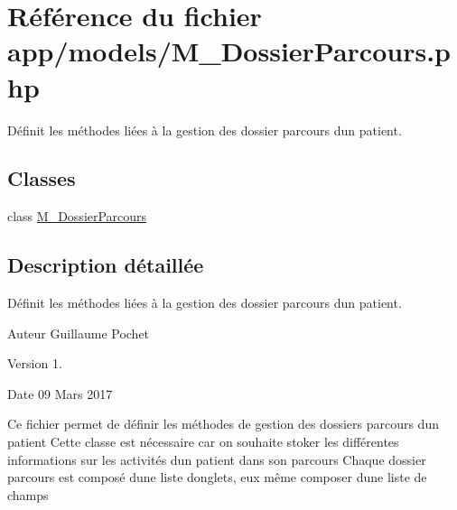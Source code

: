 \hypertarget{_m___dossier_parcours_8php}{}\section{Référence du fichier app/models/\+M\+\_\+\+Dossier\+Parcours.php}
\label{_m___dossier_parcours_8php}


Définit les méthodes liées à la gestion des dossier parcours d\textquotesingle{}un patient.  


\subsection*{Classes}
\begin{DoxyCompactItemize}
\item 
class \hyperlink{class_m___dossier_parcours}{M\+\_\+\+Dossier\+Parcours}
\end{DoxyCompactItemize}


\subsection{Description détaillée}
Définit les méthodes liées à la gestion des dossier parcours d\textquotesingle{}un patient. 

\begin{DoxyAuthor}{Auteur}
Guillaume Pochet 
\end{DoxyAuthor}
\begin{DoxyVersion}{Version}
1. 
\end{DoxyVersion}
\begin{DoxyDate}{Date}
09 Mars 2017
\end{DoxyDate}
Ce fichier permet de définir les méthodes de gestion des dossiers parcours d\textquotesingle{}un patient Cette classe est nécessaire car on souhaite stoker les différentes informations sur les activités d\textquotesingle{}un patient dans son parcours Chaque dossier parcours est composé d\textquotesingle{}une liste d\textquotesingle{}onglets, eux même composer d\textquotesingle{}une liste de champs 